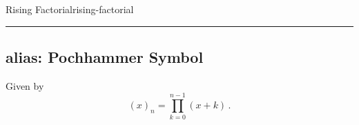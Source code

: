 \begin{definition}{Rising Factorial}{rising-factorial}
  \begin{center}\rule{0.5\linewidth}{0.5pt}\end{center}

  \hypertarget{alias-pochhammer-symbol}{%
    \subsection{alias: Pochhammer Symbol}\label{alias-pochhammer-symbol}}

  Given by \[(x)_n = \prod_{k=0}^{n-1} (x+k)\,.\]
\end{definition}
